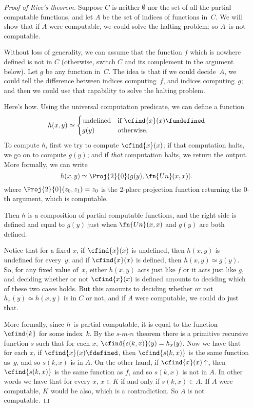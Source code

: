 \documentclass[../../../include/open-logic-section]{subfiles}
\begin{document}
\begin{proof}[Proof of Rice's theorem]
Suppose $C$ is neither $\emptyset$ nor the set of all the partial
computable functions, and let $A$ be the set of indices of functions
in~$C$. We will show that if $A$ were computable, we could solve the
halting problem; so $A$~is not computable.

Without loss of generality, we can assume that the function $f$ which
is nowhere defined is not in $C$ (otherwise, switch $C$ and its
complement in the argument below). Let $g$ be any function in~$C$. The
idea is that if we could decide~$A$, we could tell the difference
between indices computing~$f$, and indices computing~$g$; and then we
could use that capability to solve the halting problem.

Here's how. Using the universal computation predicate, we can define a
function
\[
h(x,y) \simeq
\begin{cases}
\text{undefined} & \text{if $\cfind{x}(x) \fundefined$} \\
g(y) & \text{otherwise.}
\end{cases}
\]
To compute $h$, first we try to compute $\cfind{x}(x)$; if that
computation halts, we go on to compute $g(y)$; and if {\em that}
computation halts, we return the output. More formally, we can write
\[
h(x,y) \simeq \Proj{2}{0}(g(y),\fn{Un}(x,x)).
\]
where $\Proj{2}{0}(z_0, z_1) = z_0$ is the $2$-place projection
function returning the $0$-th argument, which is computable.

Then $h$ is a composition of partial computable functions, and the right
side is defined and equal to $g(y)$ just when $\fn{Un}(x,x)$ and
$g(y)$ are both defined.

Notice that for a fixed $x$, if $\cfind{x}(x)$ is undefined, then
$h(x,y)$ is undefined for every~$y$; and if $\cfind{x}(x)$ is defined,
then $h(x,y) \simeq g(y)$. So, for any fixed value of~$x$, either
$h(x,y)$ acts just like $f$ or it acts just like $g$, and deciding
whether or not $\cfind{x}(x)$ is defined amounts to deciding which of
these two cases holds. But this amounts to deciding whether or not
$h_x(y) \simeq h(x,y)$ is in $C$ or not, and if $A$ were computable,
we could do just that.

More formally, since $h$~is partial computable, it is equal to the
function $\cfind{k}$ for some index~$k$. By the $s$-$m$-$n$ theorem
there is a primitive recursive function $s$ such that for each $x$,
$\cfind{s(k,x)}(y) = h_x(y)$. Now we have that for each $x$, if
$\cfind{x}(x) \fdefined$, then $\cfind{s(k,x)}$ is the same function
as~$g$, and so $s(k,x)$ is in $A$. On the other hand, if $\cfind{x}(x)
\uparrow$, then $\cfind{s(k,x)}$ is the same function as $f$, and so
$s(k,x)$ is not in $A$. In other words we have that for every $x$, $x
\in K$ if and only if $s(k,x) \in A$. If $A$ were computable, $K$
would be also, which is a contradiction. So $A$ is not computable.
\end{proof}
\end{document}
